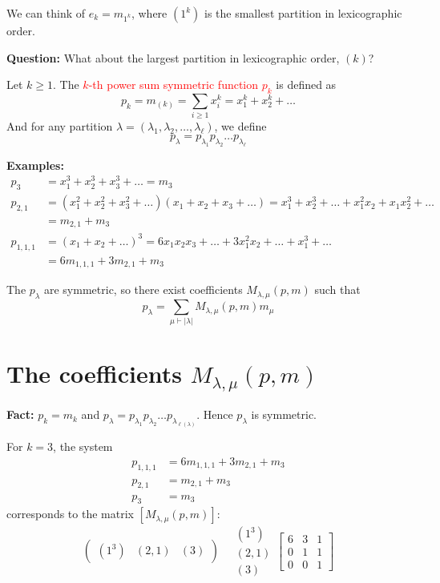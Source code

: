 \documentclass[12pt]{memoir}
\begin{document}
We can think of $e_k = m_{1^k}$, where $(1^k)$ is the smallest partition in lexicographic order.

\textbf{Question:} What about the largest partition in lexicographic order, $(k)$?

\begin{ptcb}
\begin{Def}
Let $k \ge 1$. The \textcolor{red}{$k$-th power sum symmetric function $p_k$} is defined as
\[
p_k = m_{(k)} = \sum_{i \ge 1} x_i^k = x_1^k + x_2^k + \dots
\]
And for any partition $\lambda = (\lambda_1, \lambda_2, \dots, \lambda_\ell)$, we define
\[
p_\lambda = p_{\lambda_1} p_{\lambda_2} \dots p_{\lambda_\ell}
\]
\end{Def}
\end{ptcb}

\textcolor{verdeUCR}{\textbf{Examples:}}
\begin{align*}
    p_3 &= x_1^3 + x_2^3 + x_3^3 + \dots = m_3\\[0.5em]
    p_{2,1} &= (x_1^2 + x_2^2 + x_3^2 + \dots)(x_1 + x_2 + x_3 + \dots) = x_1^3 + x_2^3 + \dots + x_1^2 x_2 + x_1 x_2^2 + \dots\\
    &= m_{2,1} + m_3\\[0.5em]
    p_{1,1,1} &= (x_1 + x_2 + \dots)^3 = 6x_1 x_2 x_3 + \dots + 3x_1^2 x_2 + \dots + x_1^3 + \dots\\
    &= 6 m_{1,1,1} + 3 m_{2,1} + m_3
\end{align*}

The $p_\lambda$ are symmetric, so there exist coefficients $M_{\lambda,\mu}(p,m)$ such that
\[
p_\lambda = \sum_{\mu \vdash |\lambda|} M_{\lambda,\mu}(p,m) m_\mu
\]

\newpage

\section{The coefficients \texorpdfstring{$M_{\lambda,\mu}(p,m)$}{M\_\{lambda,mu\}(p,m)}}

\textbf{Fact:} $p_k = m_k$ and $p_\lambda = p_{\lambda_1} p_{\lambda_2} \dots p_{\lambda_{\ell(\lambda)}}$. Hence $p_\lambda$ is symmetric.

For $k = 3$, the system
\begin{align*}
    p_{1,1,1} &= 6 m_{1,1,1} + 3 m_{2,1} + m_3\\
    p_{2,1} &= m_{2,1} + m_3\\
    p_3 &= m_3
\end{align*}
corresponds to the matrix $[M_{\lambda,\mu}(p,m)]$:
\[
\begin{pmatrix}
(1^3) & (2,1) & (3)
\end{pmatrix}
\quad
\begin{matrix}
(1^3) \\ (2,1) \\ (3)
\end{matrix}
\begin{bmatrix}
6 & 3 & 1 \\
0 & 1 & 1 \\
0 & 0 & 1
\end{bmatrix}
\]
\end{document}
